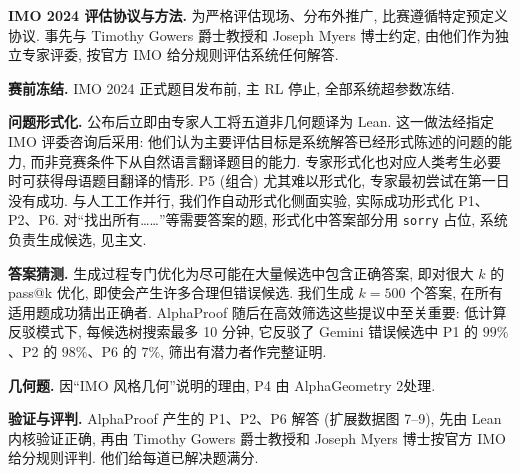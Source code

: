 \noindent\textbf{IMO 2024 评估协议与方法.} 为严格评估现场、分布外推广, 比赛遵循特定预定义协议. 事先与 Timothy Gowers 爵士教授和 Joseph Myers 博士约定, 由他们作为独立专家评委, 按官方 IMO 给分规则评估系统任何解答.

\noindent\textbf{赛前冻结.} IMO 2024 正式题目发布前, 主 RL 停止, 全部系统超参数冻结.

\noindent\textbf{问题形式化.} 公布后立即由专家人工将五道非几何题译为 Lean. 这一做法经指定 IMO 评委咨询后采用: 他们认为主要评估目标是系统解答已经形式陈述的问题的能力, 而非竞赛条件下从自然语言翻译题目的能力. 专家形式化也对应人类考生必要时可获得母语题目翻译的情形. P5 (组合) 尤其难以形式化, 专家最初尝试在第一日没有成功. 与人工工作并行, 我们作自动形式化侧面实验, 实际成功形式化 P1、P2、P6. 对“找出所有……”等需要答案的题, 形式化中答案部分用 \texttt{sorry} 占位, 系统负责生成候选, 见主文.

\noindent\textbf{答案猜测.} 生成过程专门优化为尽可能在大量候选中包含正确答案, 即对很大 $k$ 的 pass@k 优化, 即使会产生许多合理但错误候选. 我们生成 $k=500$ 个答案, 在所有适用题成功猜出正确者. AlphaProof 随后在高效筛选这些提议中至关重要: 低计算反驳模式下, 每候选树搜索最多 10 分钟, 它反驳了 Gemini 错误候选中 P1 的 $99\%$、P2 的 $98\%$、P6 的 $7\%$, 筛出有潜力者作完整证明.

\noindent\textbf{几何题.} 因“IMO 风格几何”说明的理由, P4 由 AlphaGeometry 2\cite{alphaproof-ref3}处理.

\noindent\textbf{验证与评判.} AlphaProof 产生的 P1、P2、P6 解答 (扩展数据图 7--9), 先由 Lean 内核验证正确, 再由 Timothy Gowers 爵士教授和 Joseph Myers 博士按官方 IMO 给分规则评判. 他们给每道已解决题满分.

